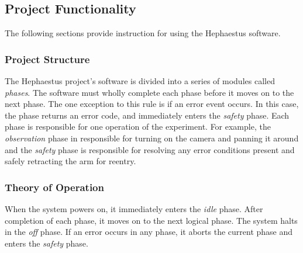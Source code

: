 \subsection{Project Functionality}
The following sections provide instruction for using the Hephaestus software.

\subsubsection{Project Structure}
The Hephaestus project's software is divided into a series of modules called
\textit{phases}.
The software must wholly complete each phase before it moves on to the next
phase.
The one exception to this rule is if an error event occurs.
In this case, the phase returns an error code, and immediately enters the 
\textit{safety} phase.
Each phase is responsible for one operation of the experiment.
For example, the \textit{observation} phase in responsible for turning on the
camera and panning it around and the \textit{safety} phase is responsible for 
resolving any error conditions present and safely retracting the arm for 
reentry.

\subsubsection{Theory of Operation}
When the system powers on, it immediately enters the \textit{idle} phase.
After completion of each phase, it moves on to the next logical phase.
The system halts in the \textit{off} phase.
If an error occurs in any phase, it aborts the current phase and enters the
\textit{safety} phase.

